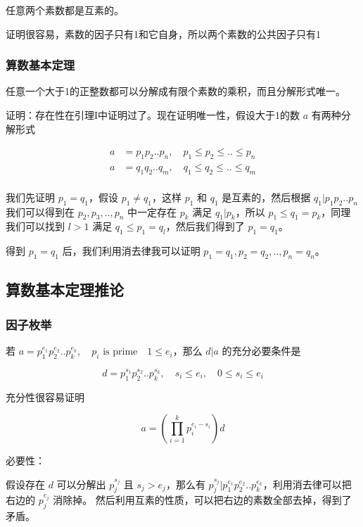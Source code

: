 \documentclass[12pt,a4paper]{ctexart}
\begin{document}
任意两个素数都是互素的。

证明很容易，素数的因子只有1和它自身，所以两个素数的公共因子只有1


\subsubsection{算数基本定理}

任意一个大于1的正整数都可以分解成有限个素数的乘积，而且分解形式唯一。

证明：存在性在引理I中证明过了。现在证明唯一性，假设大于1的数 $a$ 有两种分解形式

\begin{align*}
    a &= p_1p_2..p_n, \quad p_1 \le p_2 \le .. \le p_n \\
    a &= q_1q_2..q_m, \quad q_1 \le q_2 \le .. \le q_m \\
\end{align*}

我们先证明 $p_1 = q_1$，假设 $p_1 \ne q_1$，这样 $p_1$ 和 $q_1$ 是互素的，然后根据 $q_1 \vert p_1 p_2 .. p_n$
我们可以得到在 $p_2, p_3, .. , p_n$ 中一定存在 $p_k$ 满足 $q_1 \vert p_k$，所以 $p_1 \le q_1 = p_k$，同理我们可以找到 $l > 1$ 满足
$q_1 \le p_1 = q_l$，然后我们得到了 $p_1 = q_1$。

得到 $p_1 = q_1$ 后，我们利用消去律我可以证明 $p_1 = q_1, p_2 = q_2, .. , p_n = q_n$。

\subsection{算数基本定理推论}

\subsubsection{因子枚举}

若 $a = p_1^{e_1}p_2^{e_2}..p_k^{e_k},\quad p_i \text{ is prime} \quad 1 \le e_i $，那么 $d \vert a$ 的充分必要条件是

\[
d = p_1^{s_1}p_2^{s_2}..p_k^{s_k},\quad s_i \le e_i,\quad 0 \le s_i \le e_i
\]

充分性很容易证明 

\[
a = \left(\prod_{i=1}^{k}p_i^{e_i - s_i}\right)d
\]

必要性：

假设存在 $d$ 可以分解出 $p_j^{s_j}$ 且 $s_j > e_j$，那么有 $p_j^{s_j} \vert p_1^{e_1}p_2^{e_2}..p_k^{e_k}$，利用消去律可以把右边的 $p_j^{e_j}$ 消除掉。
然后利用互素的性质，可以把右边的素数全部去掉，得到了矛盾。
\end{document}
